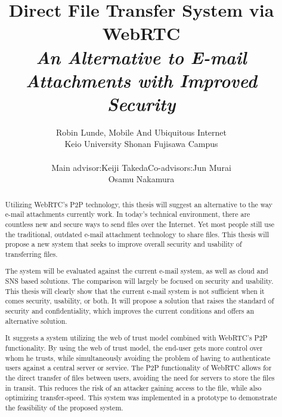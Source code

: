\documentclass[letterpaper, 10 pt, conference]{ieeeconf}  %
\title{Direct File Transfer System via WebRTC\\\textit{An Alternative to E-mail Attachments with Improved Security}}
\author{Robin Lunde, Mobile And Ubiquitous Internet\\
Keio University Shonan Fujisawa Campus\\
\\
Main advisor:\tab Keiji Takeda\tab Co-advisors:\tab Jun Murai\\
\tab[5cm] \tab \tab \tab \tab \tab[1.2cm] Osamu Nakamura
}
\begin{document}
\maketitle
\thispagestyle{empty}
\pagestyle{empty}

%
\maketitle              %

\begin{abstract}
Utilizing WebRTC's P2P technology, this thesis will suggest an alternative to the way e-mail attachments currently work. In today's technical environment, there are countless new and secure ways to send files over the Internet. Yet most people still use the traditional, outdated e-mail attachment technology to share files. This thesis will propose a new system that seeks to improve overall security and usability of transferring files.

The system will be evaluated against the current e-mail system, as well as cloud and SNS based solutions. The comparison will largely be focused on security and usability. This thesis will clearly show that the current e-mail system is not sufficient when it comes security, usability, or both. It will propose a solution that raises the standard of security and confidentiality, which improves the current conditions and offers an alternative solution.

It suggests a system utilizing the web of trust model combined with WebRTC's P2P functionality. By using the web of trust model, the end-user gets more control over whom he trusts, while simultaneously avoiding the problem of having to authenticate users against a central server or service. The P2P functionality of WebRTC allows for the direct transfer of files between users, avoiding the need for servers to store the files in transit. This reduces the risk of an attacker gaining access to the file, while also optimizing transfer-speed. This system was implemented in a prototype to demonstrate the feasibility of the proposed system.
%
\end{abstract}
%
\end{document}
